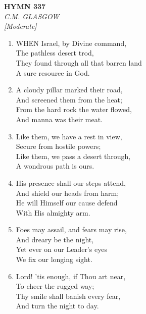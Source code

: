\newpage
\begin{center}
    {\Large \textbf{HYMN 337}}
    \\
    \textit{C.M. GLASGOW}
    \\
    \textit{\small [Moderate]}
\end{center}
\vspace{1em}

\begin{enumerate}
    \item WHEN Israel, by Divine command, \\
        The pathless desert trod, \\
        They found through all that barren land \\
        A sure resource in God.

    \item A cloudy pillar marked their road, \\
        And screened them from the heat; \\
        From the hard rock the water flowed, \\
        And manna was their meat.

    \item Like them, we have a rest in view, \\
        Secure from hostile powers; \\
        Like them, we pass a desert through, \\
        A wondrous path is ours.

    \item His presence shall our steps attend, \\
        And shield our heads from harm; \\
        He will Himself our cause defend \\
        With His almighty arm.

    \item Foes may assail, and fears may rise, \\
        And dreary be the night, \\
        Yet ever on our Leader's eyes \\
        We fix our longing sight.

    \item Lord! 'tis enough, if Thou art near, \\
        To cheer the rugged way; \\
        Thy smile shall banish every fear, \\
        And turn the night to day.

\end{enumerate}

